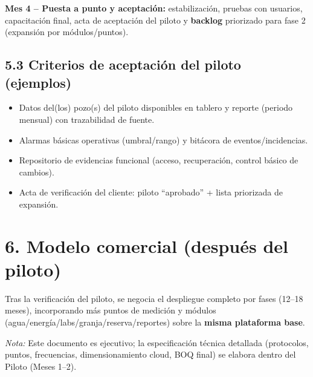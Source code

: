 \documentclass[11pt]{article}
\begin{document}
\textbf{Mes 4 -- Puesta a punto y aceptación:} estabilización, pruebas con usuarios, capacitación final, acta de aceptación del piloto y \textbf{backlog} priorizado para fase 2 (expansión por módulos/puntos).

\subsection*{5.3 Criterios de aceptación del piloto (ejemplos)}
\begin{itemize}
  \item Datos del(los) pozo(s) del piloto disponibles en tablero y reporte (periodo mensual) con trazabilidad de fuente.
  \item Alarmas básicas operativas (umbral/rango) y bitácora de eventos/incidencias.
  \item Repositorio de evidencias funcional (acceso, recuperación, control básico de cambios).
  \item Acta de verificación del cliente: piloto ``aprobado'' + lista priorizada de expansión.
\end{itemize}

\section*{6. Modelo comercial (después del piloto)}
Tras la verificación del piloto, se negocia el despliegue completo por fases (12--18 meses), incorporando más puntos de medición y módulos (agua/energía/labs/granja/reserva/reportes) sobre la \textbf{misma plataforma base}.

\vfill
\noindent\textit{Nota:} Este documento es ejecutivo; la especificación técnica detallada (protocolos, puntos, frecuencias, dimensionamiento cloud, BOQ final) se elabora dentro del Piloto (Meses 1--2).
\end{document}
